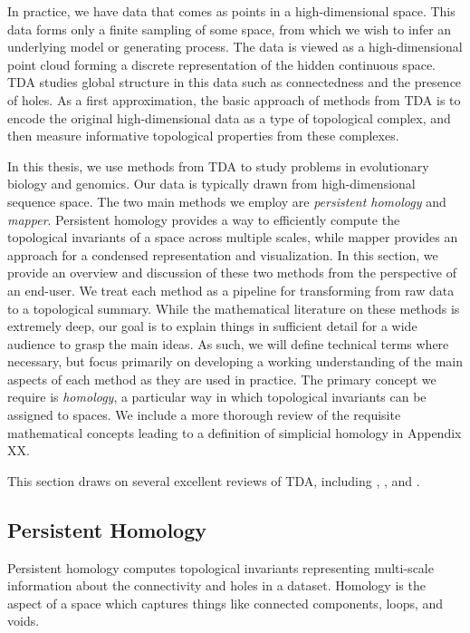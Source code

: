 In practice, we have data that comes as points in a high-dimensional space.
This data forms only a finite sampling of some space, from which we wish to infer an underlying model or generating process.
The data is viewed as a high-dimensional point cloud forming a discrete representation of the hidden continuous space.
TDA studies global structure in this data such as connectedness and the presence of holes.
As a first approximation, the basic approach of methods from TDA is to encode the original high-dimensional data as a type of topological complex, and then measure informative topological properties from these complexes.

In this thesis, we use methods from TDA to study problems in evolutionary biology and genomics.
Our data is typically drawn from high-dimensional sequence space.
The two main methods we employ are \emph{persistent homology} and \emph{mapper}.
Persistent homology provides a way to efficiently compute the topological invariants of a space across multiple scales, while mapper provides an approach for a condensed representation and visualization.
In this section, we provide an overview and discussion of these two methods from the perspective of an end-user.
We treat each method as a pipeline for transforming from raw data to a topological summary.
While the mathematical literature on these methods is extremely deep, our goal is to explain things in sufficient detail for a wide audience to grasp the main ideas.
As such, we will define technical terms where necessary, but focus primarily on developing a working understanding of the main aspects of each method as they are used in practice.
The primary concept we require is \emph{homology}, a particular way in which topological invariants can be assigned to spaces.
We include a more thorough review of the requisite mathematical concepts leading to a definition of simplicial homology in Appendix XX.

This section draws on several excellent reviews of TDA, including \cite{Carlsson:2009a}, \cite{Edelsbrunner:2010}, and \cite{Ghrist:2008}.

\subsection{Persistent Homology}

Persistent homology computes topological invariants representing multi-scale information about the connectivity and holes in a dataset.
Homology is the aspect of a space which captures things like connected components, loops, and voids.


